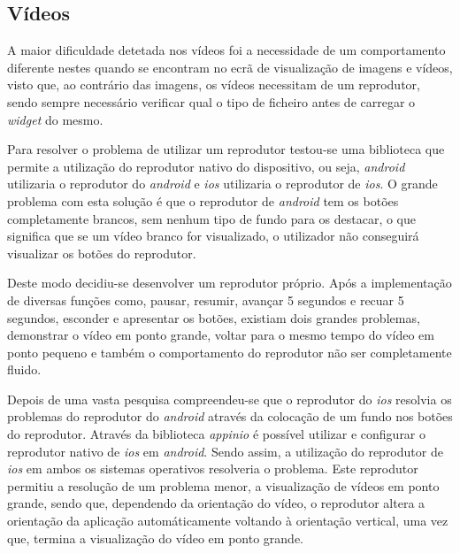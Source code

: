 \subsection{Vídeos}

A maior dificuldade detetada nos vídeos foi a necessidade de um comportamento diferente nestes quando se encontram no ecrã de visualização de imagens e vídeos, visto que, ao contrário das imagens, os vídeos necessitam de um reprodutor, sendo sempre necessário verificar qual o tipo de ficheiro antes de carregar o \textit{widget} do mesmo.

Para resolver o problema de utilizar um reprodutor testou-se uma biblioteca que permite a utilização do reprodutor nativo do dispositivo, ou seja, \textit{android} utilizaria o reprodutor do \textit{android} e \textit{ios} utilizaria o reprodutor de \textit{ios}. O grande problema com esta solução é que o reprodutor de \textit{android} tem os botões completamente brancos, sem nenhum tipo de fundo para os destacar, o que significa que se um vídeo branco for visualizado, o utilizador não conseguirá visualizar os botões do reprodutor.

Deste modo decidiu-se desenvolver um reprodutor próprio. Após a implementação de diversas funções como, pausar, resumir, avançar 5 segundos e recuar 5 segundos, esconder e apresentar os botões, existiam dois grandes problemas, demonstrar o vídeo em ponto grande, voltar para o mesmo tempo do vídeo em ponto pequeno e também o comportamento do reprodutor não ser completamente fluido.

Depois de uma vasta pesquisa compreendeu-se que o reprodutor do \textit{ios} resolvia os problemas do reprodutor do \textit{android} através da colocação de um fundo nos botões do reprodutor. Através da biblioteca \textit{appinio} é possível utilizar e configurar o reprodutor nativo de \textit{ios} em \textit{android}. Sendo assim, a utilização do reprodutor de \textit{ios} em ambos os sistemas operativos resolveria o problema. Este reprodutor permitiu a resolução de um problema menor, a visualização de vídeos em ponto grande, sendo que, dependendo da orientação do vídeo, o reprodutor altera a orientação da aplicação automáticamente voltando à orientação vertical, uma vez que, termina a visualização do vídeo em ponto grande.